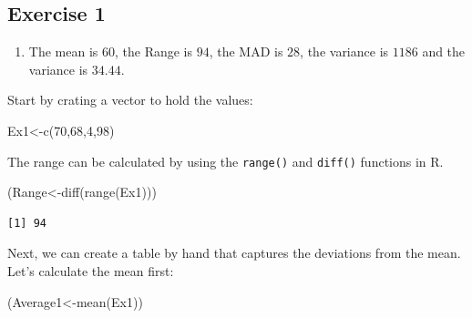 \documentclass[
  letterpaper,
  DIV=11,
  numbers=noendperiod]{scrreprt}
\newenvironment{Shaded}{\begin{snugshade}}{\end{snugshade}}
\newcommand{\DecValTok}[1]{\textcolor[rgb]{0.68,0.00,0.00}{#1}}
\newcommand{\FunctionTok}[1]{\textcolor[rgb]{0.28,0.35,0.67}{#1}}
\newcommand{\NormalTok}[1]{\textcolor[rgb]{0.00,0.23,0.31}{#1}}
\newcommand{\OtherTok}[1]{\textcolor[rgb]{0.00,0.23,0.31}{#1}}
\providecommand{\tightlist}{%
  \setlength{\itemsep}{0pt}\setlength{\parskip}{0pt}}\usepackage{longtable,booktabs,array}
\begin{document}
\hypertarget{exercise-1-7}{%
\subsection*{Exercise 1}\label{exercise-1-7}}

\begin{blackbox}

\begin{enumerate}
\def\labelenumi{\arabic{enumi}.}
\tightlist
\item
  The mean is \(60\), the Range is \(94\), the MAD is \(28\), the
  variance is \(1186\) and the variance is \(34.44\).
\end{enumerate}

\end{blackbox}

Start by crating a vector to hold the values:

\begin{Shaded}
\begin{Highlighting}[numbers=left,,]
\NormalTok{Ex1}\OtherTok{\textless{}{-}}\FunctionTok{c}\NormalTok{(}\DecValTok{70}\NormalTok{,}\DecValTok{68}\NormalTok{,}\DecValTok{4}\NormalTok{,}\DecValTok{98}\NormalTok{)}
\end{Highlighting}
\end{Shaded}

The range can be calculated by using the \texttt{range()} and
\texttt{diff()} functions in R.

\begin{Shaded}
\begin{Highlighting}[numbers=left,,]
\NormalTok{(Range}\OtherTok{\textless{}{-}}\FunctionTok{diff}\NormalTok{(}\FunctionTok{range}\NormalTok{(Ex1)))}
\end{Highlighting}
\end{Shaded}

\begin{verbatim}
[1] 94
\end{verbatim}

Next, we can create a table by hand that captures the deviations from
the mean. Let's calculate the mean first:

\begin{Shaded}
\begin{Highlighting}[numbers=left,,]
\NormalTok{(Average1}\OtherTok{\textless{}{-}}\FunctionTok{mean}\NormalTok{(Ex1))}
\end{Highlighting}
\end{Shaded}
\end{document}
